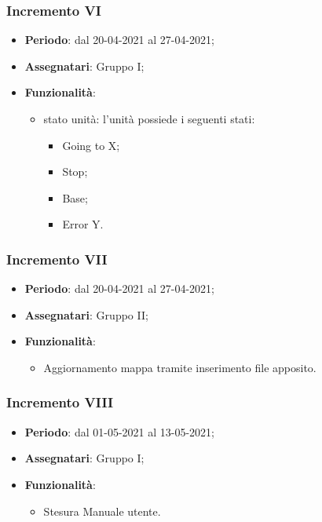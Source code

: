\subsubsection{Incremento VI}
\begin{itemize}
	\item \textbf{Periodo}: dal 20-04-2021 al 27-04-2021;
	\item \textbf{Assegnatari}: Gruppo I;
	\item \textbf{Funzionalità}:
	\begin{itemize}
		\item stato unità: l'unità possiede i seguenti stati:
		\begin{itemize}
			\item Going to X;
			\item Stop;
			\item Base;
			\item Error Y.
		\end{itemize}	
	\end{itemize}	
\end{itemize}

\subsubsection{Incremento VII}
\begin{itemize}
	\item \textbf{Periodo}: dal 20-04-2021 al 27-04-2021;
	\item \textbf{Assegnatari}: Gruppo II;
	\item \textbf{Funzionalità}:
	\begin{itemize}
		\item Aggiornamento mappa tramite inserimento file apposito.	
	\end{itemize}	
\end{itemize}

\subsubsection{Incremento VIII}
\begin{itemize}
	\item \textbf{Periodo}: dal 01-05-2021 al 13-05-2021;
	\item \textbf{Assegnatari}: Gruppo I;
	\item \textbf{Funzionalità}:
	\begin{itemize}
		\item Stesura Manuale utente.
	\end{itemize}	
\end{itemize}


